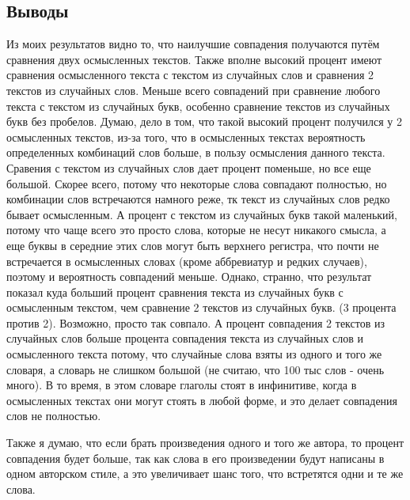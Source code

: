 \documentclass[12pt]{article}
\begin{document}
\subsection*{Выводы}
Из моих результатов видно то, что наилучшие совпадения получаются путём сравнения двух осмысленных текстов. Также вполне высокий процент имеют сравнения осмысленного текста с текстом из случайных слов и сравнения 2 текстов из случайных слов. Меньше всего совпадений при сравнение любого текста с текстом из случайных букв, особенно сравнение текстов из случайных букв без пробелов. Думаю, дело в том, что такой высокий процент получился у 2 осмысленных текстов, из-за того, что в осмысленных текстах вероятность определенных комбинаций слов больше, в пользу осмысления данного текста. Сравения с текстом из случайных слов дает процент поменьше, но все еще большой. Скорее всего, потому что некоторые слова совпадают полностью, но комбинации слов встречаются намного реже, тк текст из случайных слов редко бывает осмысленным. А процент с текстом из случайных букв такой маленький, потому что чаще всего это просто слова, которые не несут никакого смысла, а еще буквы в середние этих слов могут быть верхнего регистра, что почти не встречается в осмысленных словах (кроме аббревиатур и редких случаев), поэтому и вероятность совпадений меньше. Однако, странно, что результат показал куда больший процент сравнения текста из случайных букв с осмысленным текстом, чем сравнение 2 текстов из случайных букв. (3 процента против 2). Возможно, просто так совпало. А процент совпадения 2 текстов из случайных слов больше процента совпадения текста из случайных слов и осмысленного текста потому, что случайные слова взяты из одного и того же словаря, а словарь не слишком большой (не считаю, что 100 тыс слов - очень много). В то время, в этом словаре глаголы стоят в инфинитиве, когда в осмысленных текстах они могут стоять в любой форме, и это делает совпадения слов не полностью.
\par Также я думаю, что если брать произведения одного и того же автора, то процент совпадения будет больше, так как слова в его произведении будут написаны в одном авторском стиле, а это увеличивает шанс того, что встретятся одни и те же слова.
\end{document}
